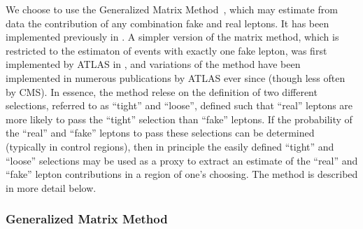 We choose to use the Generalized Matrix Method~\cite{Gillam:2014xua}, 
which may estimate from data the contribution of any combination
fake and real leptons. It has been implemented previously in 
\cite{Arguin:1558979}. A simpler version of the matrix
method, which is restricted to the estimaton of events with 
exactly one fake lepton, 
was first implemented by ATLAS in \cite{ATLAS-CONF-2010-087}, 
and variations of the method have been implemented in numerous publications
by ATLAS ever since (though less often by CMS).
In essence, the method relese on the definition of two different selections,
referred to as ``tight'' and ``loose'', defined such that
``real'' leptons are more likely to pass the ``tight'' selection
than ``fake'' leptons. If the probability of the ``real'' and 
``fake'' leptons to pass these selections can be determined (typically
in control regions), 
then in principle the easily defined
``tight'' and ``loose'' selections may be used
as a proxy
to extract an estimate of the 
``real'' and ``fake'' lepton
contributions in a region of one's choosing.
The method is described in more detail below.



\subsubsection{Generalized Matrix Method}
\label{sec:mxm}

